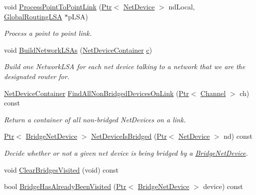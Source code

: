 \begin{DoxyCompactItemize}
void \hyperlink{classns3_1_1GlobalRouter_adaf99c499d6e42e450a31b53a8019b14}{Process\+Point\+To\+Point\+Link} (\hyperlink{classns3_1_1Ptr}{Ptr}$<$ \hyperlink{classns3_1_1NetDevice}{Net\+Device} $>$ nd\+Local, \hyperlink{classns3_1_1GlobalRoutingLSA}{Global\+Routing\+L\+SA} $\ast$p\+L\+SA)
\begin{DoxyCompactList}\small\item\em Process a point to point link. \end{DoxyCompactList}\item 
void \hyperlink{classns3_1_1GlobalRouter_aff937ae50e8cc2de5a6e989cbe17609b}{Build\+Network\+L\+S\+As} (\hyperlink{classns3_1_1NetDeviceContainer}{Net\+Device\+Container} \hyperlink{mmwave_2model_2fading-traces_2fading__trace__generator_8m_ae0323a9039add2978bf5b49550572c7c}{c})
\begin{DoxyCompactList}\small\item\em Build one Network\+L\+SA for each net device talking to a network that we are the designated router for. \end{DoxyCompactList}\item 
\hyperlink{classns3_1_1NetDeviceContainer}{Net\+Device\+Container} \hyperlink{classns3_1_1GlobalRouter_af1fc3edcc4d14d9344f3b94617da8e85}{Find\+All\+Non\+Bridged\+Devices\+On\+Link} (\hyperlink{classns3_1_1Ptr}{Ptr}$<$ \hyperlink{classns3_1_1Channel}{Channel} $>$ ch) const 
\begin{DoxyCompactList}\small\item\em Return a container of all non-\/bridged Net\+Devices on a link. \end{DoxyCompactList}\item 
\hyperlink{classns3_1_1Ptr}{Ptr}$<$ \hyperlink{classns3_1_1BridgeNetDevice}{Bridge\+Net\+Device} $>$ \hyperlink{classns3_1_1GlobalRouter_ad330b65439cd1be39799b52df948f98b}{Net\+Device\+Is\+Bridged} (\hyperlink{classns3_1_1Ptr}{Ptr}$<$ \hyperlink{classns3_1_1NetDevice}{Net\+Device} $>$ nd) const 
\begin{DoxyCompactList}\small\item\em Decide whether or not a given net device is being bridged by a \hyperlink{classns3_1_1BridgeNetDevice}{Bridge\+Net\+Device}. \end{DoxyCompactList}\item 
void \hyperlink{classns3_1_1GlobalRouter_a2519d9ebeb7425ffe4569c6ed0eaf4cf}{Clear\+Bridges\+Visited} (void) const 
\item 
bool \hyperlink{classns3_1_1GlobalRouter_ab358e6c36f04f05c42a4ca2c472c3179}{Bridge\+Has\+Already\+Been\+Visited} (\hyperlink{classns3_1_1Ptr}{Ptr}$<$ \hyperlink{classns3_1_1BridgeNetDevice}{Bridge\+Net\+Device} $>$ device) const 

\end{DoxyCompactItemize}
